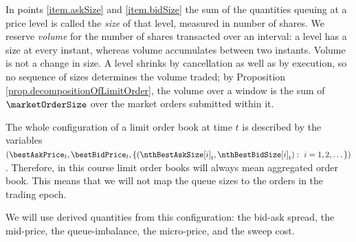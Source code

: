 \begin{remark}
\label{remark.sizeVersusVolume}
In points \ref{item.askSize} and \ref{item.bidSize} the sum of the quantities queuing at a
price level is called the \emph{size} of that level,
measured in number of shares.
We reserve \emph{volume} for the number of shares transacted over an interval:
a level has a size at every instant, whereas volume accumulates between two instants.
Volume is not a change in size.
A level shrinks by cancellation as well as by execution,
so no sequence of sizes determines the volume traded;
by Proposition \ref{prop.decompositionOfLimitOrder},
the volume over a window is the sum of $\marketOrderSize$
over the market orders submitted within it.
\end{remark}

The whole configuration of a limit order book at time $t$ is described by the variables
$(\bestAskPrice_t, \bestBidPrice_t, \lbrace (\nthBestAskSize[i]_t, \nthBestBidSize[i]_t) : \, \, i=1,2,\dots\rbrace)$.
Therefore,
in this course
limit order books will always mean aggregated order book.
This means that we will not map the queue sizes to  the orders in the trading epoch.


We will use derived quantities from this configuration:
the bid-ask spread,
the mid-price,
the queue-imbalance,
the micro-price,
and the sweep cost.


